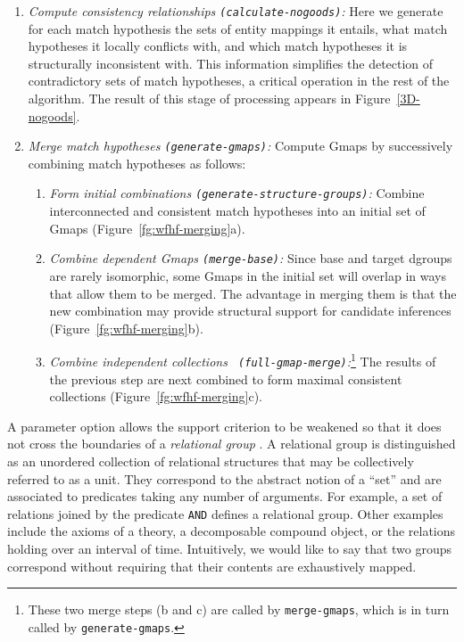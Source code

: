 \begin{enumerate}
\item {\em Compute consistency relationships {\tt (calculate-nogoods)}:}
Here we generate for each match hypothesis the sets of entity mappings it
entails, what match hypotheses it locally conflicts with, and which match
hypotheses it is structurally inconsistent with.  This information
simplifies the detection of contradictory sets of match hypotheses, a
critical operation in the rest of the algorithm. The result of this stage of
processing appears in Figure~\ref{3D-nogoods}.

\item {\em Merge match hypotheses {\tt (generate-gmaps)}:} Compute Gmaps by
successively combining match hypotheses as follows:
 \begin{enumerate}
 \item {\em Form initial combinations {\tt (generate-structure-groups)}:}
Combine interconnected and consistent match hypotheses into an initial set
of Gmaps (Figure~\ref{fg:wfhf-merging}a).
 \item {\em Combine dependent Gmaps {\tt (merge-base)}:} Since base and
target dgroups are rarely isomorphic, some Gmaps in the initial set will
overlap in ways that allow them to be merged.  The advantage in merging them
is that the new combination may provide structural support for candidate
inferences (Figure~\ref{fg:wfhf-merging}b).
 \item {\em Combine independent collections {\tt
(full-gmap-merge)}:}\footnote{These two merge steps (b and c) are called by
{\tt merge-gmaps}, which is in turn called by {\tt generate-gmaps}.} The
results of the previous step are next combined to form maximal consistent
collections (Figure~\ref{fg:wfhf-merging}c).
 \end{enumerate}
\end{enumerate}

A parameter option allows the support criterion to be weakened so that it
does not cross the boundaries of a {\it relational group} \cite{Falken-phd}.
A relational group is distinguished as an unordered collection of relational
structures that may be collectively referred to as a unit.  They correspond
to the abstract notion of a ``set'' and are associated to predicates taking
any number of arguments.  For example, a set of relations joined by the
predicate {\tt AND} defines a relational group.  Other examples include the
axioms of a theory, a decomposable compound object, or the relations holding
over an interval of time.  Intuitively, we would like to say that two groups
correspond without requiring that their contents are exhaustively mapped.

